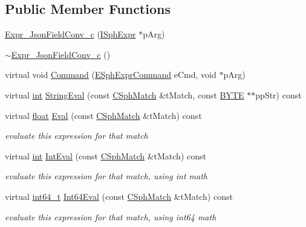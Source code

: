 \subsection*{Public Member Functions}
\begin{DoxyCompactItemize}
\item 
\hyperlink{structExpr__JsonFieldConv__c_a9b77f39e332434adb056185fdd353a6d}{Expr\-\_\-\-Json\-Field\-Conv\-\_\-c} (\hyperlink{structISphExpr}{I\-Sph\-Expr} $\ast$p\-Arg)
\item 
\hyperlink{structExpr__JsonFieldConv__c_aea9405be4f96ee68a288c3b94cbc330a}{$\sim$\-Expr\-\_\-\-Json\-Field\-Conv\-\_\-c} ()
\item 
virtual void \hyperlink{structExpr__JsonFieldConv__c_a88c51150e1a4796cd1c7a3c1299a7a69}{Command} (\hyperlink{sphinxexpr_8h_a30be184fb07bd80c271360fc6094c818}{E\-Sph\-Expr\-Command} e\-Cmd, void $\ast$p\-Arg)
\item 
virtual \hyperlink{sphinxexpr_8cpp_a4a26e8f9cb8b736e0c4cbf4d16de985e}{int} \hyperlink{structExpr__JsonFieldConv__c_a7f5627797c62c1cabc8b702f76720f60}{String\-Eval} (const \hyperlink{classCSphMatch}{C\-Sph\-Match} \&t\-Match, const \hyperlink{sphinxstd_8h_a4ae1dab0fb4b072a66584546209e7d58}{B\-Y\-T\-E} $\ast$$\ast$pp\-Str) const 
\item 
virtual \hyperlink{sphinxexpr_8cpp_a0e0d0739f7035f18f949c2db2c6759ec}{float} \hyperlink{structExpr__JsonFieldConv__c_ad2a89bbb4f25a716fd2aad04e3f25046}{Eval} (const \hyperlink{classCSphMatch}{C\-Sph\-Match} \&t\-Match) const 
\begin{DoxyCompactList}\small\item\em evaluate this expression for that match \end{DoxyCompactList}\item 
virtual \hyperlink{sphinxexpr_8cpp_a4a26e8f9cb8b736e0c4cbf4d16de985e}{int} \hyperlink{structExpr__JsonFieldConv__c_adcacb65eebc2ddf21b6d104d169e91cf}{Int\-Eval} (const \hyperlink{classCSphMatch}{C\-Sph\-Match} \&t\-Match) const 
\begin{DoxyCompactList}\small\item\em evaluate this expression for that match, using int math \end{DoxyCompactList}\item 
virtual \hyperlink{sphinxstd_8h_a996e72f71b11a5bb8b3b7b6936b1516d}{int64\-\_\-t} \hyperlink{structExpr__JsonFieldConv__c_a82e10983b72a893d66105466dde3dbab}{Int64\-Eval} (const \hyperlink{classCSphMatch}{C\-Sph\-Match} \&t\-Match) const 
\begin{DoxyCompactList}\small\item\em evaluate this expression for that match, using int64 math \end{DoxyCompactList}\item 
$$
\end{DoxyCompactItemize}
